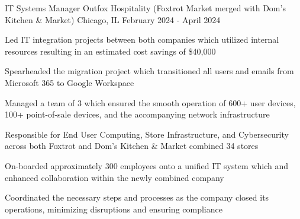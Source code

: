 

\begin{cventries}

	\cventry
	{IT Systems Manager} %
  {Outfox Hospitality (Foxtrot Market merged with Dom's Kitchen \& Market)} %
	{Chicago, IL} %
  {February 2024 - April 2024} %
	{
    \begin{cvitems} %
			\item {Led IT integration projects between both companies which utilized internal resources resulting in an estimated cost savings of \$40,000}
      \item {Spearheaded the migration project which transitioned all users and emails from Microsoft 365 to Google Workspace}
      \item {Managed a team of 3 which ensured the smooth operation of 600+ user devices, 100+ point-of-sale devices, and the accompanying network infrastructure}
      \item {Responsible for End User Computing, Store Infrastructure, and Cybersecurity across both Foxtrot and Dom's Kitchen \& Market combined 34 stores}
      \item {On-boarded approximately 300 employees onto a unified IT system which and enhanced collaboration within the newly combined company}
      \item {Coordinated the necessary steps and processes as the company closed its operations, minimizing disruptions and ensuring compliance}
    \end{cvitems}
  }


\end{cventries}
